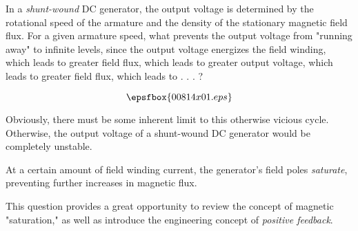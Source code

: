 

In a {\it shunt-wound} DC generator, the output voltage is determined by the rotational speed of the armature and the density of the stationary magnetic field flux.  For a given armature speed, what prevents the output voltage from "running away" to infinite levels, since the output voltage energizes the field winding, which leads to greater field flux, which leads to greater output voltage, which leads to greater field flux, which leads to . . . ?

$$\epsfbox{00814x01.eps}$$

Obviously, there must be some inherent limit to this otherwise vicious cycle.  Otherwise, the output voltage of a shunt-wound DC generator would be completely unstable.







At a certain amount of field winding current, the generator's field poles {\it saturate}, preventing further increases in magnetic flux.







This question provides a great opportunity to review the concept of magnetic "saturation," as well as introduce the engineering concept of {\it positive feedback}.





